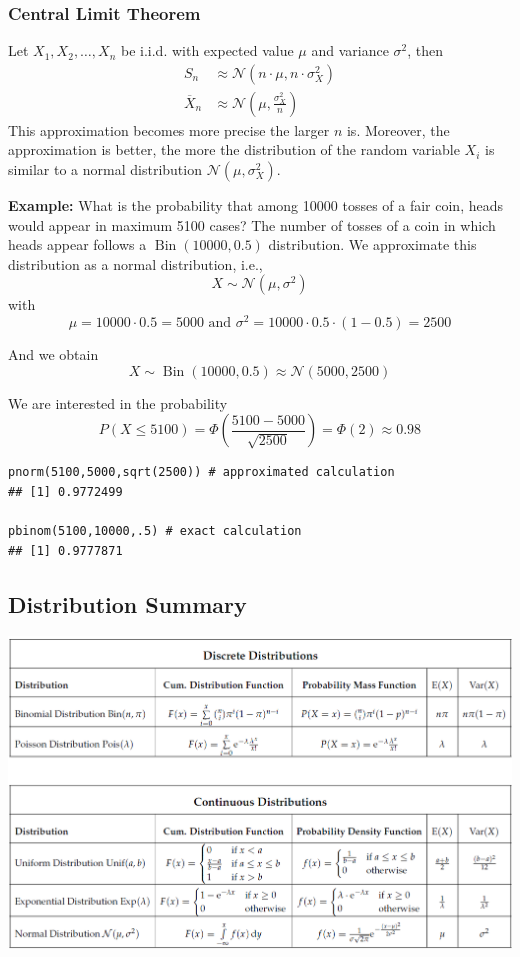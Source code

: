 \documentclass[11pt]{article}
\newcommand*\samplemean[1]{\overline{#1}}
\newcommand*\N[1]{\mathcal{N}\left(#1\right)}
\begin{document}
\subsubsection{Central Limit Theorem}
\begin{definition}
	Let $X_1,X_2,\dots,X_n$ be i.i.d. with expected value $\mu$ and variance $\sigma^2$, then
	\begin{align*}
		S_n &\approx \N{n \cdot \mu, n \cdot \sigma_X^2}\\
		\samplemean{X}_n &\approx \N{\mu,\frac{\sigma_X^2}{n}}
	\end{align*}
	This approximation becomes more precise the larger $n$ is. Moreover, the approximation is better, the more the distribution of the random variable $X_i$ is similar to a normal distribution $\N{\mu,\sigma_X^2}$.
\end{definition}


\noindent
\textbf{Example:} What is the probability that among 10000 tosses of a fair coin, heads would appear in maximum 5100 cases? The number of tosses of a coin in which heads appear follows a $\operatorname{Bin}(10000,0.5)$ distribution. We approximate this distribution as a normal distribution, i.e.,
$$
X \sim \mathcal{N}\left(\mu, \sigma^2\right)
$$
with
$$
\mu=10000 \cdot 0.5=5000 \text { and } \sigma^2=10000 \cdot 0.5 \cdot(1-0.5)=2500
$$

\noindent
And we obtain
$$
X \sim \operatorname{Bin}(10000,0.5) \approx \mathcal{N}(5000,2500)
$$

\noindent
We are interested in the probability
$$
P(X \leq 5100)=\Phi\left(\frac{5100-5000}{\sqrt{2500}}\right)=\Phi(2) \approx 0.98
$$


\begin{verbatim}
pnorm(5100,5000,sqrt(2500)) # approximated calculation
## [1] 0.9772499

pbinom(5100,10000,.5) # exact calculation
## [1] 0.9777871
\end{verbatim}

\subsection{Distribution Summary}

\begin{center}
	\includegraphics[width=1.0\linewidth]{img/distribution-summary}
\end{center}
\end{document}
